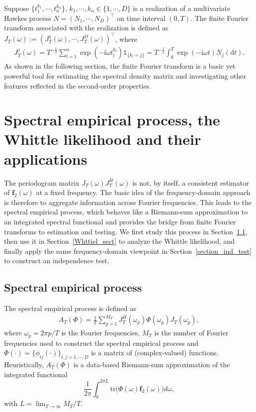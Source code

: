 \documentclass[11pt]{article}
\numberwithin{equation}{section}
\theoremstyle{plain}
\theoremstyle{definition}
\theoremstyle{definition}
\theoremstyle{assumption}
\theoremstyle{proposition}
\theoremstyle{proposition}
\theoremstyle{example}
\theoremstyle{lemma}
\theoremstyle{theorem}
\theoremstyle{remark}
\begin{document}
Suppose $\{t_1^{k_1},\cdots,t_{n}^{k_{n}}\}$, $k_1,\cdots,k_{n}\in\{1,\cdots,D\}$ is a realization of a multivariate Hawkes process $N = (N_1,\cdots,N_D)^{\top}$ on time interval $(0,T)$. The finite Fourier transform associated with the realization is defined as $J_T(\omega) := (J_T^{1}(\omega),\cdots,J_T^{D}(\omega))^{\top}$, where
\begin{align*}
J_T^{j}(\omega) = T^{-\frac{1}{2}}\sum_{l=1}^{n} \exp(-\mathrm{i}\omega t_l^{k_l})\mathds{1}_{\{k_l = j\}} = T^{-\frac{1}{2}}\int_0^T \exp(-\mathrm{i} \omega t)N_{j}(\mathrm{d}t).
\end{align*}
As shown in the following section, the finite Fourier transform is a basic yet powerful tool for estimating the spectral density matrix and investigating other features reflected in the second-order properties.

\section{Spectral empirical process, the Whittle likelihood and their applications}\label{sect_spectral}
The periodogram matrix $J_T(\omega)J_T^H(\omega)$ is not, by itself, a consistent estimator of $\boldsymbol f_2(\omega)$ at a fixed frequency. The basic idea of the frequency-domain approach is therefore to aggregate information across Fourier frequencies. This leads to the spectral empirical process, which behaves like a Riemann-sum approximation to an integrated spectral functional and provides the bridge from finite Fourier transforms to estimation and testing. We first study this process in Section~\ref{spec_ep_sect}, then use it in Section~\ref{Whttiel_sect} to analyze the Whittle likelihood, and finally apply the same frequency-domain viewpoint in Section~\ref{section_ind_test} to construct an independence test.


\subsection{Spectral empirical process}\label{spec_ep_sect}
The spectral empirical process is defined as
\begin{align}\label{def_SEP}
    A_T(\Phi) = \frac{1}{T}\sum_{p=1}^{M_T} J_T^{H}(\omega_p)\Phi(\omega_p)J_T(\omega_p),
\end{align}
where $\omega_p = 2\pi p/T$ is the Fourier frequencies, $M_T$ is the number of Fourier frequencies used to construct the spectral empirical process and $\Phi(\cdot)=\{\phi_{ij}(\cdot)\}_{i,j=1,\cdots,D}$ is a matrix of (complex-valued) functions. Heuristically, $A_T(\Phi)$ is a data-based Riemann-sum approximation of the integrated functional
\[
\frac{1}{2\pi}\int_0^{2\pi L}\text{tr} \big(\Phi(\omega)\boldsymbol f_2(\omega)\big) d\omega,
\]
with $L=\lim_{T\rightarrow\infty} M_T/T$. 
\end{document}
